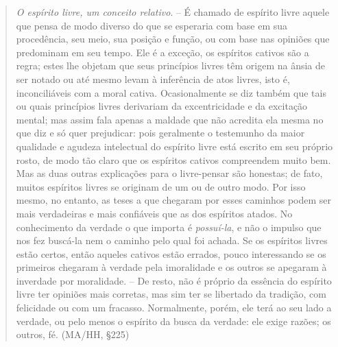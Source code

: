 \documentclass[
	12pt,				%
	openright,			%
	oneside,			%
	a4paper,			%
	english,			%
	french,				%
	spanish,			%
	brazil				%
	]{abntex2}
\begin{document}
\begin{quotation}
\textit{O espírito livre, um conceito relativo}. – É chamado de espírito livre aquele que pensa de modo diverso do que se esperaria com base em sua procedência, seu meio, sua posição e função, ou com base nas opiniões que predominam em seu tempo. Ele é a exceção, os espíritos cativos são a regra; estes lhe objetam que seus princípios livres têm origem na ânsia de ser notado ou até mesmo levam à inferência de atos livres, isto é, inconciliáveis com a moral cativa. Ocasionalmente se diz também que tais ou quais princípios livres derivariam da excentricidade e da excitação mental; mas assim fala apenas a maldade que não acredita ela mesma no que diz e só quer prejudicar: pois geralmente o testemunho da maior qualidade e agudeza intelectual do espírito livre está escrito em seu próprio rosto, de modo tão claro que os espíritos cativos compreendem muito bem. Mas as duas outras explicações para o livre-pensar são honestas; de fato, muitos espíritos livres se originam de um ou de outro modo. Por isso mesmo, no entanto, as teses a que chegaram por esses caminhos podem ser mais verdadeiras e mais confiáveis que as dos espíritos atados. No conhecimento da verdade o que importa é \textit{possuí-la}, e não o impulso que nos fez buscá-la nem o caminho pelo qual foi achada. Se os espíritos livres estão certos, então aqueles cativos estão errados, pouco interessando se os primeiros chegaram à verdade pela imoralidade e os outros se apegaram à inverdade por moralidade. – De resto, não é próprio da essência do espírito livre ter opiniões mais corretas, mas sim ter se libertado da tradição, com felicidade ou com um fracasso. Normalmente, porém, ele terá ao seu lado a verdade, ou pelo menos o espírito da busca da verdade: ele exige razões; os outros, fé. (MA/HH, §225)
\end{quotation}
\end{document}
